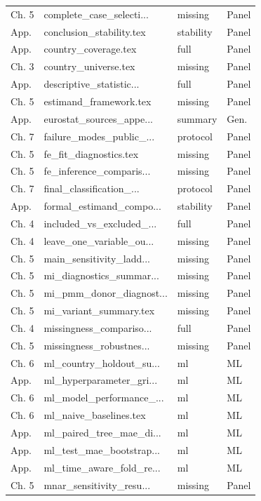 \begin{longtable}{@{}p{}p{}p{}p{}@{}}
Ch. 5 & complete\_case\_selecti... & missing & Panel \\
App. & conclusion\_stability.tex & stability & Panel \\
App. & country\_coverage.tex & full & Panel \\
Ch. 3 & country\_universe.tex & missing & Panel \\
App. & descriptive\_statistic... & full & Panel \\
Ch. 5 & estimand\_framework.tex & missing & Panel \\
App. & eurostat\_sources\_appe... & summary & Gen. \\
Ch. 7 & failure\_modes\_public\_... & protocol & Panel \\
Ch. 5 & fe\_fit\_diagnostics.tex & missing & Panel \\
Ch. 5 & fe\_inference\_comparis... & missing & Panel \\
Ch. 7 & final\_classification\_... & protocol & Panel \\
App. & formal\_estimand\_compo... & stability & Panel \\
Ch. 4 & included\_vs\_excluded\_... & full & Panel \\
Ch. 4 & leave\_one\_variable\_ou... & missing & Panel \\
Ch. 5 & main\_sensitivity\_ladd... & missing & Panel \\
Ch. 5 & mi\_diagnostics\_summar... & missing & Panel \\
Ch. 5 & mi\_pmm\_donor\_diagnost... & missing & Panel \\
Ch. 5 & mi\_variant\_summary.tex & missing & Panel \\
Ch. 4 & missingness\_compariso... & full & Panel \\
Ch. 5 & missingness\_robustnes... & missing & Panel \\
Ch. 6 & ml\_country\_holdout\_su... & ml & ML \\
App. & ml\_hyperparameter\_gri... & ml & ML \\
Ch. 6 & ml\_model\_performance\_... & ml & ML \\
Ch. 6 & ml\_naive\_baselines.tex & ml & ML \\
App. & ml\_paired\_tree\_mae\_di... & ml & ML \\
App. & ml\_test\_mae\_bootstrap... & ml & ML \\
App. & ml\_time\_aware\_fold\_re... & ml & ML \\
Ch. 5 & mnar\_sensitivity\_resu... & missing & Panel \\

\end{longtable}
